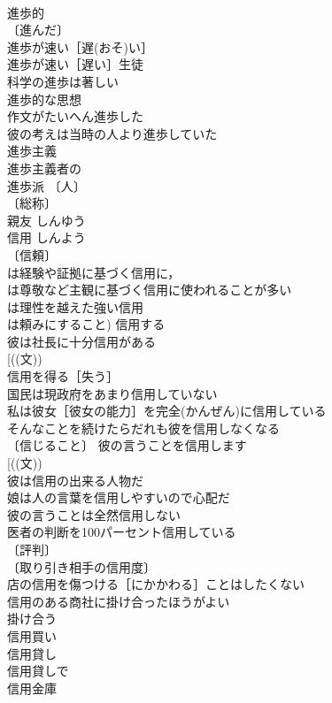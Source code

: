 \documentclass[8pt]{extreport}
\begin{document}
\begin{CJK}{UTF8}{min}
\\	進歩的 
\\	〔進んだ〕
\\	進歩が速い［遅(おそ)い］ 
\\	進歩が速い［遅い］生徒 
\\	科学の進歩は著しい 
\\	進歩的な思想 
\\	作文がたいへん進歩した 
\\	彼の考えは当時の人より進歩していた 
\\	進歩主義 
\\	進歩主義者の 
\\	進歩派 〔人〕
\\	〔総称〕
\\	親友	しんゆう	
\\	信用	しんよう	
\\	〔信頼〕
\\	は経験や証拠に基づく信用に，
\\	は尊敬など主観に基づく信用に使われることが多い
\\	は理性を越えた強い信用
\\	は頼みにすること) 信用する 
\\	彼は社長に十分信用がある 
\\	[((文)) 
\\	信用を得る［失う］ 
\\	国民は現政府をあまり信用していない 
\\	私は彼女［彼女の能力］を完全(かんぜん)に信用している 
\\	そんなことを続けたらだれも彼を信用しなくなる 
\\	〔信じること〕 彼の言うことを信用します 
\\	[((文))
\\	彼は信用の出来る人物だ 
\\	娘は人の言葉を信用しやすいので心配だ 
\\	彼の言うことは全然信用しない 
\\	医者の判断を100パーセント信用している 
\\	〔評判〕
\\	〔取り引き相手の信用度〕
\\	店の信用を傷つける［にかかわる］ことはしたくない 
\\	信用のある商社に掛け合ったほうがよい 
\\	掛け合う　
\\	信用買い 
\\	信用貸し 
\\	信用貸しで 
\\	信用金庫 

\end{CJK}
\end{document}
